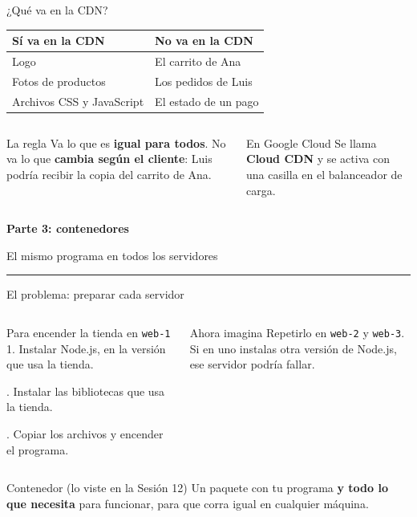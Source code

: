 \documentclass[aspectratio=169,10pt,c]{beamer}
\newcommand{\separador}[2]{%
\begin{frame}[plain]
\vfill
\begin{center}
{\fontsize{29}{34}\selectfont\bfseries #1}\par
\vspace{2mm}
{\small #2}\par
\vspace{4mm}
{\color{utpRojo}\rule{8.5cm}{1.2pt}}
\end{center}
\vfill
\end{frame}}
\begin{document}
\begin{frame}{¿Qué va en la CDN?}
\renewcommand{\arraystretch}{1.35}
\centering\small
\begin{tabular}{@{}>{\raggedright\arraybackslash}p{5.6cm}>{\raggedright\arraybackslash}p{5.6cm}@{}}
\toprule
\textbf{Sí va en la CDN} & \textbf{No va en la CDN}\\
\midrule
Logo & El carrito de Ana\\
Fotos de productos & Los pedidos de Luis\\
Archivos CSS y JavaScript & El estado de un pago\\
\bottomrule
\end{tabular}
\par\vspace{5mm}
\begin{columns}[T,onlytextwidth]
\begin{alertblock}{La regla}
\small Va lo que es \textbf{igual para todos}. No va lo que \textbf{cambia según el cliente}: Luis podría recibir la copia del carrito de Ana.
\end{alertblock}
\begin{block}{En Google Cloud}
\small Se llama \textbf{Cloud CDN} y se activa con una casilla en el balanceador de carga.
\end{block}
\end{columns}
\end{frame}

\separador{Parte 3: contenedores}{El mismo programa en todos los servidores}

\begin{frame}{El problema: preparar cada servidor}
\begin{columns}[T,onlytextwidth]
\begin{block}{Para encender la tienda en \texttt{web-1}}
\small
1. Instalar Node.js, en la versión que usa la tienda.\par{}. Instalar las bibliotecas que usa la tienda.\par{}. Copiar los archivos y encender el programa.
\end{block}
\begin{alertblock}{Ahora imagina}
\small Repetirlo en \texttt{web-2} y \texttt{web-3}. Si en uno instalas otra versión de Node.js, ese servidor podría fallar.
\end{alertblock}
\end{columns}
\par\vspace{5mm}
\begin{block}{Contenedor (lo viste en la Sesión 12)}
\small Un paquete con tu programa \textbf{y todo lo que necesita} para funcionar, para que corra igual en cualquier máquina.
\end{block}
\end{frame}
\end{document}
